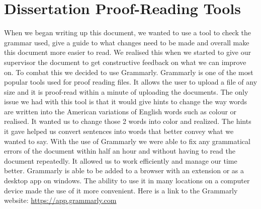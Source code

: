 \section{Dissertation Proof-Reading Tools}
When we began writing up this document, we wanted to use a tool to check the grammar used, give a guide to what changes need to be made and overall make this document more easier to read. We realised this when we started to give our supervisor the document to get constructive feedback on what we can improve on.  To combat this we decided to use Grammarly. \newline \newline
Grammarly is one of the most popular tools used for proof reading files.  It allows the user to upload a file of any size and it is proof-read within a minute of uploading the documents. The only issue we had with this tool is that it would give hints to change the way words are written into the \newline American variations of English words such as colour or realised. It wanted us to change those 2 words into color and realized. The hints it gave helped us convert sentences into words that better convey what we wanted to say.
\newline \newline
With the use of Grammarly we were able to fix any grammatical errors of the document within half an hour and without having to read the document repeatedly. It allowed us to work efficiently and manage our time better. Grammarly is able to be added to a browser with an extension or as a desktop app on windows. The ability to use it in many locations on a computer device made the use of it more convenient. \newline
Here is a link to the Grammarly website: {\url{https://app.grammarly.com}}
